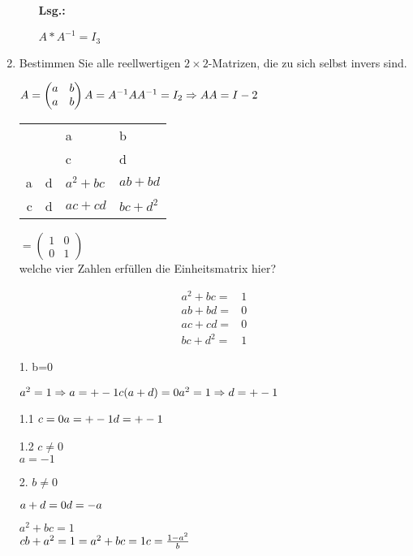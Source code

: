 \documentclass[12pt,a4paper]{scrreprt}
\newcommand{\Lsg}{\textbf{Lsg.:}}
\begin{document}
\begin{enumerate}
\begin{enumerate}
\Lsg

$A*A^{-1} = I_3$

	\end{enumerate}

	\item Bestimmen Sie alle  reellwertigen $2 \times 2$-Matrizen, die zu sich selbst invers sind.

$
A=\begin{pmatrix}a & b \\ a & b\end{pmatrix} \\
A=A^{-1} \\
AA^{-1}=I_2 \Rightarrow AA=I-2$ \\
\begin{tabular}{rr|ll}
	&	&	a &	b \\
	&	&	c &	d \\
	\hline 
 a	& d	& $a^2+bc$ & $ab+bd$ \\
 c	& d	& $ac+cd$	& $bc+d^2$ 
\end{tabular} $= \begin{pmatrix} 1 & 0 \\ 0 & 1 \end{pmatrix}$ \\
welche vier Zahlen erfüllen die Einheitsmatrix hier?

\begin{align*}
a^2+bc =& 1 \\
ab+bd =& 0 \\
ac+cd =& 0 \\
bc+d^2 =& 1
\end{align*}


1. b=0

$
a^2=1 \Rightarrow a=+-1 \\
c(a+d)=0 \\
a^2=1 \Rightarrow d=+-1 
$

1.1
$c=0 \\
a=+-1 \\
d=+-1 \\
$

1.2
$c\neq0$ \\
$a=-1$

2. $b\neq0$

$a+d=0 \\
d=-a$

$a^2+bc=1$ \\
$cb+a^2=1 = a^2+bc=1  \\
c=\frac{1-a^2}{b}$


\end{enumerate}
\end{document}
